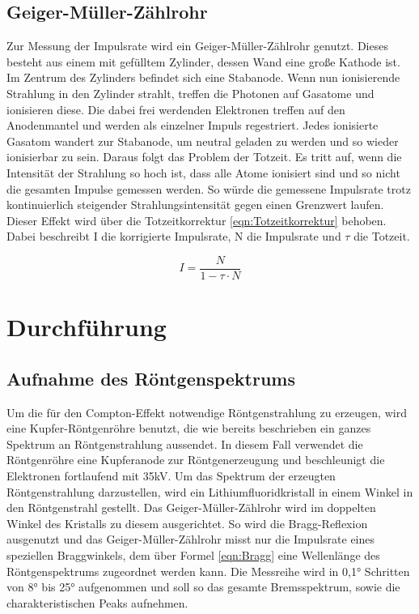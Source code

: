 \documentclass[titlepage = firstcover]{scrartcl}
\begin{document}
        \subsection{Geiger-Müller-Zählrohr} \label{Geiger}
        Zur Messung der Impulsrate wird ein Geiger-Müller-Zählrohr genutzt. Dieses besteht aus einem mit gefülltem Zylinder, dessen Wand eine große
        Kathode ist. Im Zentrum des Zylinders befindet sich eine Stabanode. Wenn nun ionisierende Strahlung in den Zylinder strahlt, treffen die Photonen
        auf Gasatome und ionisieren diese. Die dabei frei werdenden Elektronen treffen auf den Anodenmantel und werden als einzelner Impuls regestriert. Jedes
        ionisierte Gasatom wandert zur Stabanode, um neutral geladen zu werden und so wieder ionisierbar zu sein. Daraus folgt das Problem der Totzeit. Es 
        tritt auf, wenn die Intensität der Strahlung so hoch ist, dass alle Atome ionisiert sind und so nicht die gesamten Impulse gemessen werden. So würde 
        die gemessene Impulsrate trotz kontinuierlich steigender Strahlungsintensität gegen einen Grenzwert laufen. Dieser Effekt wird über die 
        Totzeitkorrektur \ref{eqn:Totzeitkorrektur} behoben. Dabei beschreibt I die korrigierte Impulsrate, N die Impulsrate und $\tau$ die Totzeit.
        
        \begin{equation}
            I = \frac{N}{1-\tau \cdot N}
            \label{eqn:Totzeitkorrektur}
        \end{equation}
        

    \section{Durchführung}
        \subsection{Aufnahme des Röntgenspektrums}
        Um die für den Compton-Effekt notwendige Röntgenstrahlung zu erzeugen, wird eine Kupfer-Röntgenröhre benutzt, die wie bereits beschrieben ein ganzes 
        Spektrum an Röntgenstrahlung aussendet. In diesem Fall verwendet die Röntgenröhre eine Kupferanode zur Röntgenerzeugung und beschleunigt die Elektronen
        fortlaufend mit 35kV. Um das Spektrum der 
        erzeugten Röntgenstrahlung darzustellen, wird ein Lithiumfluoridkristall in einem Winkel in den Röntgenstrahl gestellt. Das Geiger-Müller-Zählrohr
        wird im doppelten Winkel des Kristalls zu diesem ausgerichtet. So wird die Bragg-Reflexion ausgenutzt und das Geiger-Müller-Zählrohr misst nur die
        Impulsrate eines speziellen Braggwinkels, dem über Formel \ref{eqn:Bragg} eine Wellenlänge des Röntgenspektrums zugeordnet werden kann. Die Messreihe
        wird in 0,1° Schritten von 8° bis 25° aufgenommen und soll so das gesamte Bremsspektrum, sowie die charakteristischen Peaks aufnehmen.
        
\end{document}
